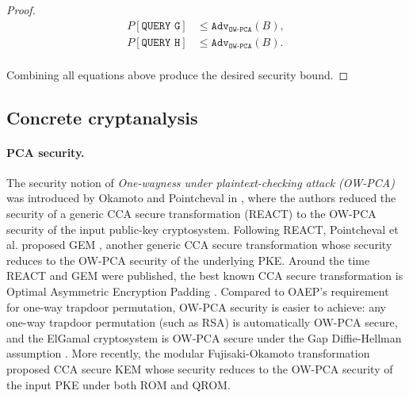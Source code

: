 \documentclass[runningheads]{llncs}
\newcommand{\adv}{\texttt{Adv}}
\begin{document}
\begin{proof}
    \begin{equation*}
        \begin{aligned}
            P\left[\texttt{QUERY G}\right] &\leq \adv_\texttt{OW-PCA}(B), \\
            P\left[\texttt{QUERY H}\right] &\leq \adv_\texttt{OW-PCA}(B). \\
        \end{aligned}
    \end{equation*}

    Combining all equations above produce the desired security bound.
\end{proof}

\subsection{Concrete cryptanalysis}\label{sec:concrete-cryptanalysis}
\paragraph{PCA security.} The security notion of \textit{One-wayness under plaintext-checking attack (OW-PCA)} was introduced by Okamoto and Pointcheval in \cite{DBLP:conf/ctrsa/OkamotoP01}, where the authors reduced the security of a generic CCA secure transformation (REACT) to the OW-PCA security of the input public-key cryptosystem. Following REACT, Pointcheval et al. proposed GEM \cite{DBLP:conf/ctrsa/CoronHJPPT02}, another generic CCA secure transformation whose security reduces to the OW-PCA security of the underlying PKE. Around the time REACT and GEM were published, the best known CCA secure transformation is Optimal Asymmetric Encryption Padding \cite{DBLP:conf/eurocrypt/BellareR94}. Compared to OAEP's requirement for one-way trapdoor permutation, OW-PCA security is easier to achieve: any one-way trapdoor permutation (such as RSA) is automatically OW-PCA secure, and the ElGamal cryptosystem is OW-PCA secure under the Gap Diffie-Hellman assumption \cite{DBLP:conf/pkc/OkamotoP01}. More recently, the modular Fujisaki-Okamoto transformation \cite{DBLP:conf/tcc/HofheinzHK17} proposed CCA secure KEM whose security reduces to the OW-PCA security of the input PKE under both ROM and QROM.
\end{document}
